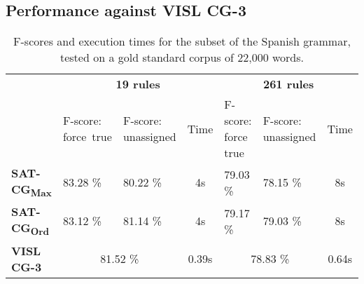 


\def\satcgMax{SAT-CG\textsubscript{Max}}
\def\satcgOrd{SAT-CG\textsubscript{Ord}}

\subsection{Performance against VISL CG-3}


\begin{table}[h]
\centering
\begin{tabular}{l | p{1.8cm} p{1.8cm} c | p{1.8cm} p{1.8cm}  c}
 
           & \multicolumn{3}{c}{\textbf{19 rules}} &  \multicolumn{3}{c}{\textbf{261 rules}} \\ 
                          & F-score: force~true  &  F-score: unassigned & Time   
                                               & F-score: force true  &  F-score: unassigned & Time \\ \hline
      \textbf{\satcgMax}  & 83.28 \% & 80.22 \%  & 4s  & 79.03 \% & 78.15 \% & 8s \\ 
      \textbf{\satcgOrd}  & 83.12 \% & 81.14 \%  & 4s  & 79.17 \%  & 79.03 \% & 8s \\ 
      \textbf{VISL CG-3}  & \multicolumn{2}{c}{81.52 \%}  & 0.39s
                                             & \multicolumn{2}{c}{78.83 \%} & 0.64s\\ 
  \end{tabular}
\caption{F-scores and execution times for the subset of the Spanish grammar, tested on a gold standard corpus of 22,000 words.}
  \label{table:fscore}
\end{table}

